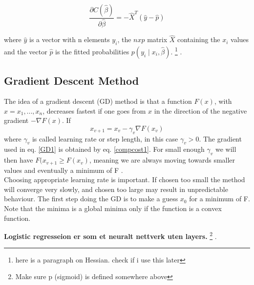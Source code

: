 \documentclass[a4paper,11pt,twocolumn]{article}
\begin{document}
\begin{equation}
\frac{\partial C(\hat{\beta})}{\partial\hat{\beta}}=-\hat{X}^T(\hat{y}-\hat{p})
\label{compcost1}
\end{equation}


where $\hat{y}$ is a vector with n elements $y_i$, the $n x p$ matrix $\hat{X}$ containing the $x_i$ values and the vector $\hat{p}$ is the fitted probabilities $p(y_i\mid x_i,\hat{\beta})$.
\footnote{here is a paragraph on Hessian. check if i use this later}
\cite{slides}. 

\subsection{Gradient Descent Method}

The idea of a gradient descent (GD) method is that a function $F(x)$, with $x=x_1,...,x_n$, decreases fastest if one goes from $x$ in the direction of the negative gradient $-\nabla F(x)$. If 
\begin{equation}
x_{v+1}=x_v-\gamma_v\nabla F(x_v)
\label{GD1}
\end{equation}
where $\gamma_v$ is called learning rate or step length, in this case $\gamma_v>0$. The gradient used in eq. \eqref{GD1} is obtained by eq. \eqref{compcost1}. For small enough $\gamma_v$ we will then have $F(x_{v+1}\geq F(x_v)$, meaning we are always moving towards smaller values and eventually a minimum of F \cite{slides}.
\\ 
Choosing appropriate learning rate is important. If chosen too small the method will converge very slowly, and chosen too large may result in unpredictable behaviour. The first step doing the GD is to make a guess $x_0$ for a minimum of F. Note that the minima is a global minima only if the function is a convex function. 

\textbf{Logistic regresseion er som et neuralt nettverk uten layers.} 
\footnote{Make sure p (sigmoid) is defined somewhere above}
\cite{slides}. 
\end{document}
